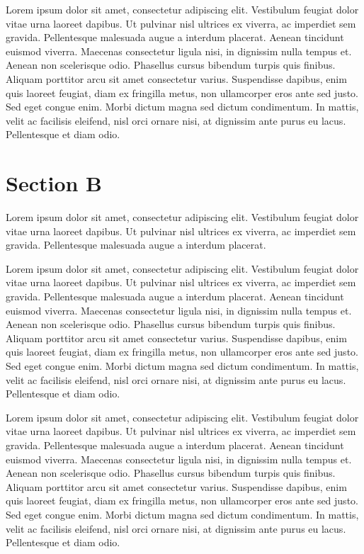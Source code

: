 \documentclass{article}
\begin{document}
\resumenumbering
\pstart
Lorem ipsum dolor sit amet, consectetur adipiscing elit. Vestibulum feugiat dolor vitae urna laoreet dapibus. Ut pulvinar nisl ultrices ex viverra, ac imperdiet sem gravida. Pellentesque malesuada augue a interdum placerat. Aenean tincidunt euismod viverra. Maecenas consectetur ligula nisi, in dignissim nulla tempus et. Aenean non scelerisque odio. Phasellus cursus bibendum turpis quis finibus. Aliquam porttitor arcu sit amet consectetur varius. Suspendisse dapibus, enim quis laoreet feugiat, diam ex fringilla metus, non ullamcorper eros ante sed justo. Sed eget congue enim. Morbi dictum magna sed dictum condimentum. In mattis, velit ac facilisis eleifend, nisl orci ornare nisi, at dignissim ante purus eu lacus. Pellentesque et diam odio.
\pend
\endnumbering

\section{Section B}

\begin{pairs}
\begin{Leftside}
\beginnumbering
\pstart
Lorem ipsum dolor sit amet, consectetur adipiscing elit. Vestibulum feugiat dolor vitae urna laoreet dapibus. Ut pulvinar nisl ultrices ex viverra, ac imperdiet sem gravida. Pellentesque malesuada augue a interdum placerat.
\pend
\pausenumbering
\end{Leftside}

\begin{Rightside}
\beginnumbering
\pstart
Lorem ipsum dolor sit amet, consectetur adipiscing elit. Vestibulum feugiat dolor vitae urna laoreet dapibus. Ut pulvinar nisl ultrices ex viverra, ac imperdiet sem gravida. Pellentesque malesuada augue a interdum placerat. Aenean tincidunt euismod viverra. Maecenas consectetur ligula nisi, in dignissim nulla tempus et. Aenean non scelerisque odio. Phasellus cursus bibendum turpis quis finibus. Aliquam porttitor arcu sit amet consectetur varius. Suspendisse dapibus, enim quis laoreet feugiat, diam ex fringilla metus, non ullamcorper eros ante sed justo. Sed eget congue enim. Morbi dictum magna sed dictum condimentum. In mattis, velit ac facilisis eleifend, nisl orci ornare nisi, at dignissim ante purus eu lacus. Pellentesque et diam odio.
\pend
\endnumbering
\end{Rightside}
\end{pairs}
\Columns

\resumenumbering
\pstart
Lorem ipsum dolor sit amet, consectetur adipiscing elit. Vestibulum feugiat dolor vitae urna laoreet dapibus. Ut pulvinar nisl ultrices ex viverra, ac imperdiet sem gravida. Pellentesque malesuada augue a interdum placerat. Aenean tincidunt euismod viverra. Maecenas consectetur ligula nisi, in dignissim nulla tempus et. Aenean non scelerisque odio. Phasellus cursus bibendum turpis quis finibus. Aliquam porttitor arcu sit amet consectetur varius. Suspendisse dapibus, enim quis laoreet feugiat, diam ex fringilla metus, non ullamcorper eros ante sed justo. Sed eget congue enim. Morbi dictum magna sed dictum condimentum. In mattis, velit ac facilisis eleifend, nisl orci ornare nisi, at dignissim ante purus eu lacus. Pellentesque et diam odio.
\pend
\end{document}
